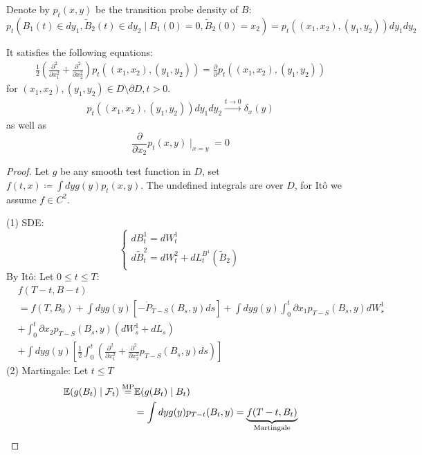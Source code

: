 \begin{proposition}\label{prop:3.11}
    Denote by $p_t(x,y)$ be the transition probe density of $B$:\[p_t(B_1(t)\in dy_1, \tilde{B}_2(t)\in dy_2\mid B_1(0)=0,\tilde{B}_2(0)=x_2)=p_t((x_1,x_2),(y_1,y_2))dy_1dy_2\] 

    It satisfies the following equations:
    \begin{align*}
        \frac{1}{2}\left(\frac{\partial^2}{\partial x_1^2}+\frac{\partial^2}{\partial x_2^2}\right)p_t((x_1,x_2),(y_1,y_2))=\frac{\partial}{\partial}p_t((x_1,x_2),(y_1,y_2))
    \end{align*}
    for $(x_1,x_2),(y_1,y_2)\in D\setminus \partial D,t>0$.
    \begin{align*}
        p_t((x_1,x_2),(y_1,y_2))dy_1dy_2\stackrel{t\to0}{\to}\delta_{x}(y)
    \end{align*}
    as well as 
    \[\frac{\partial}{\partial x_2}p_t(x,y)\mid_{x=y}=0\]

\end{proposition}

\begin{proof}
    Let $g$ be any smooth test function in $D$, set $f(t,x)\coloneqq \int dy g(y)p_t(x,y)$. The undefined integrals are over $D$, for Itô we assume $f\in C^2$.

    (1) SDE: \[\begin{cases}
        dB_t^1=dW_t^1\\
        d\tilde{B}_t^2=dW_t^2+dL_t^{B^1}(\tilde{B}_2)
    \end{cases}\]
    By Itô: Let $0\leq t\leq T$:
    \begin{align*}
        &f(T-t,B-t)\\
        &=f(T,B_0)+\int dy g(y)[-\dot{P}_{T-S}(B_s,y)ds]+\int dy g(y)\int_0^t \partial x_1 p_{T-S}(B_s,y)dW_s^1\\
        &+\int_0^t \partial x_2 p_{T-S}(B_s,y)(dW_s^1+dL_s)\\
        &+ \int dy g(y)\left[\frac{1}{2}\int_0^t\left(\frac{\partial^2}{\partial x_1^2}+\frac{\partial^2}{\partial x_2^2}p_{T-S}(B_s,y)ds\right)\right]
    \end{align*}
    (2) Martingale: Let $t\leq T$
    \begin{align*}
        \mathbb{E}(g(B_t)\mid \mathcal{F}_t)\stackrel{\text{MP}}{=}&\mathbb{E}(g(B_t)\mid B_t)\\
        &=\int dy g(y)p_{T-t}(B_t,y)=\underbrace{f(T-t,B_t)}_{\text{Martingale}}
    \end{align*}
\end{proof}



